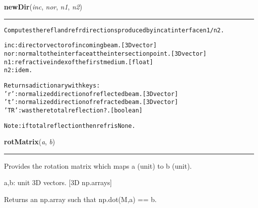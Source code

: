 \hspace{.8\funcindent}\begin{boxedminipage}{\funcwidth}

    \raggedright \textbf{newDir}(\textit{inc}, \textit{nor}, \textit{n1}, \textit{n2})

    \vspace{-1.5ex}

    \rule{\textwidth}{0.5\fboxrule}
\setlength{\parskip}{2ex}
\begin{alltt}
Computes the refl and refr directions produced by inc at interface n1/n2.

inc: director vector of incoming beam. [3D vector]
nor: normal to the interface at the intersection point. [3D vector]
n1: refractive index of the first medium. [float]
n2: idem.

Returns a dictionary with keys:
    'r': normalized direction of reflected beam. [3D vector]
    't': normalized direction of refracted beam. [3D vector]
    'TR': was there total reflection?. [boolean]

Note: if total reflection then refr is None.
\end{alltt}

\setlength{\parskip}{1ex}
    \end{boxedminipage}

    \label{theia:helpers:geometry:rotMatrix}

    \vspace{0.5ex}

\hspace{.8\funcindent}\begin{boxedminipage}{\funcwidth}

    \raggedright \textbf{rotMatrix}(\textit{a}, \textit{b})

    \vspace{-1.5ex}

    \rule{\textwidth}{0.5\fboxrule}
\setlength{\parskip}{2ex}
    Provides the rotation matrix which maps a (unit) to b (unit).

    a,b: unit 3D vectors. [3D np.arrays]

    Returns an np.array such that np.dot(M,a) == b.

\setlength{\parskip}{1ex}
    \end{boxedminipage}

    \label{theia:helpers:geometry:basis}

